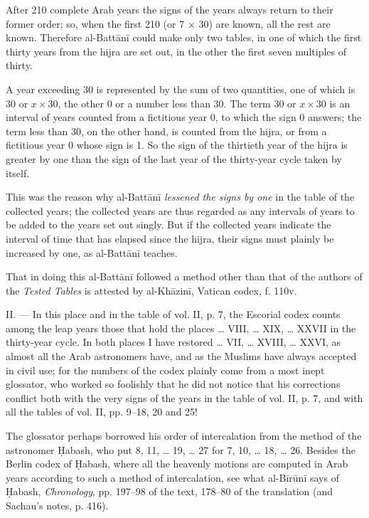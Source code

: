 \documentclass[11pt]{article}
\begin{document}
\par After 210 complete Arab years the signs of the years always return to their former order; so, when the first 210 (or 7 × 30) are known, all the rest are known. Therefore al-Battānī could make only two tables, in one of which the first thirty years from the hijra are set out, in the other the first seven multiples of thirty.\par
\par A year exceeding 30 is represented by the sum of two quantities, one of which is 30 or $x \times 30$, the other 0 or a number less than 30. The term 30 or $x \times 30$ is an interval of years counted from a fictitious year 0, to which the sign 0 answers; the term less than 30, on the other hand, is counted from the hijra, or from a fictitious year 0 whose sign is 1. So the sign of the thirtieth year of the hijra is greater by one than the sign of the last year of the thirty-year cycle taken by itself.\par
\par This was the reason why al-Battānī \emph{lessened the signs by one} in the table of the collected years; the collected years are thus regarded as any intervals of years to be added to the years set out singly. But if the collected years indicate the interval of time that has elapsed since the hijra, their signs must plainly be increased by one, as al-Battānī teaches.\par
\par That in doing this al-Battānī followed a method other than that of the authors of the \emph{Tested Tables} is attested by al-Khāzinī, Vatican codex, f. 110v.\par
\par II. — In this place and in the table of vol. II, p. 7, the Escorial codex counts among the leap years those that hold the places … VIII, … XIX, … XXVII in the thirty-year cycle. In both places I have restored … VII, … XVIII, … XXVI, as almost all the Arab astronomers have, and as the Muslims have always accepted in civil use; for the numbers of the codex plainly come from a most inept glossator, who worked so foolishly that he did not notice that his corrections conflict both with the very signs of the years in the table of vol. II, p. 7, and with all the tables of vol. II, pp. 9–18, 20 and 25!\par
\par The glossator perhaps borrowed his order of intercalation from the method of the astronomer Ḥabash, who put 8, 11, … 19, … 27 for 7, 10, … 18, … 26. Besides the Berlin codex of Ḥabash, where all the heavenly motions are computed in Arab years according to such a method of intercalation, see what al-Bīrūnī says of Ḥabash, \emph{Chronology}, pp. 197–98 of the text, 178–80 of the translation (and Sachau's notes, p. 416).\par
\end{document}
